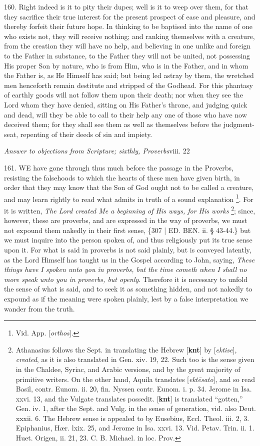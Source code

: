 160. Right indeed is it to
pity their dupes; well is it to weep over them, for that they
sacrifice their true interest for the present prospect of ease and
pleasure, and thereby forfeit their future hope. In thinking to
be baptised into the name of one who exists not, they will receive
nothing; and ranking themselves with a creature, from the creation
they will have no help, and believing in one unlike and foreign to the
Father in substance, to the Father they will not be united, not
possessing His proper Son by nature, who is from Him, who is in the
Father, and in whom the Father is, as He Himself has said; but being
led astray by them, the wretched men henceforth remain destitute and
stripped of the Godhead. For this phantasy of earthly goods will not
follow them upon their death; nor when they see the Lord whom they
have denied, sitting on His Father's throne, and judging quick and
dead, will they be able to call to their help any one of those who
have now deceived them; for they shall see them as well as themselves
before the judgment-seat, repenting of their deeds of sin and impiety.


\emph{Answer
to objections from Scripture; sixthly, Proverbs}viii.
22

161. WE
have gone through thus much before the passage in the Proverbs,
resisting the falsehoods to which the hearts of these men have given
birth, in order that they may know that the Son of God ought not to be
called a creature, and may learn rightly to read what admits in truth
of a sound explanation \footnote{Vid. App. [\emph{orthos}].}.
For it is written, \emph{The Lord created Me a beginning of His ways, for
His works} \footnote{Athanasius follows the Sept. in translating the Hebrew [\textbf{knt}] by
[\emph{ektise}], \emph{created}, \emph{}as it is also translated in Gen. xiv.
19, 22. Such too is the sense given in the Chaldee, Syriac, and Arabic
versions, and by the great majority of primitive writers. On the other
hand, Aquila translates [\emph{ekt\={e}sato}], and so read Basil,
contr. Eunom. ii. 20, fin. Nyssen contr. Eunom. i. p. 34. Jerome in
Isa. xxvi. 13, and the Vulgate translates possedit. [\textbf{knt}] is
translated ``gotten,'' Gen. iv. 1, after the Sept. and Vulg. in the
sense of generation, vid. also Deut. xxxii. 6. The
Hebrew sense is appealed to by Eusebius, Eccl. Theol. iii. 2,
3. Epiphanius, Hær. lxix. 25, and Jerome in Isa. xxvi. 13. Vid. Petav.
Trin. ii. 1. Huet. Origen, ii. 21, 23. C. B. Michael. in loc. Prov.}; since,
however, these are proverbs, and are expressed in the way of proverbs,
we must not expound them nakedly in their first sense, \{307 | ED.
BEN. ii. § 43-44.\} but we must inquire into the
person spoken of, and thus religiously put its true sense upon it. For
what is said in proverbs is not said plainly, but is conveyed
latently, as the Lord Himself has taught us in the Gospel according to
John, saying, \emph{These things have I spoken unto you in proverbs, but
the time cometh when I shall no more speak unto you in proverbs, but
openly}. Therefore it is necessary to unfold the sense of what is
said, and to seek it as something hidden, and not nakedly to expound
as if the meaning were spoken plainly, lest by a false interpretation
we wander from the truth.

